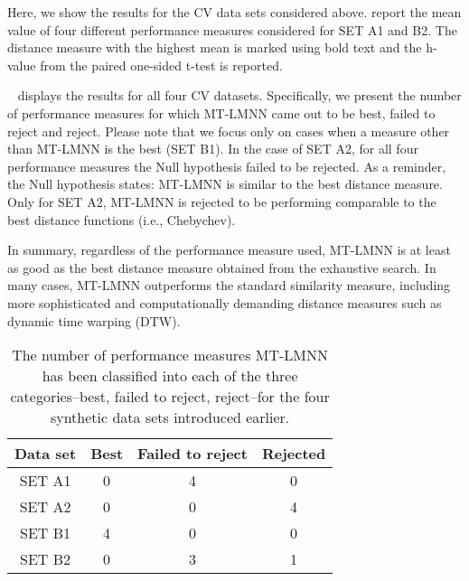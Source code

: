 Here, we show the results for the CV data sets considered above.   report the mean value of four different performance measures considered for SET A1 and B2. 
The distance measure with the highest mean is marked using bold text and the h-value from the paired one-sided t-test is reported.

~ displays the results for all four CV datasets. Specifically, we present the number of performance measures for which MT-LMNN came out to be best, failed to reject and reject. Please note that we focus only on cases when a measure other than MT-LMNN is the best (SET B1). 
In the case of SET A2, for all four performance measures the Null hypothesis failed to be rejected. As a reminder, the Null hypothesis states: MT-LMNN is similar to the best distance measure. Only for SET A2, MT-LMNN is rejected to be performing comparable to the best distance functions (i.e., Chebychev).


In summary, regardless of the performance measure used, MT-LMNN is at least as good as the best distance measure obtained from the exhaustive search. 
In many cases, MT-LMNN outperforms the standard similarity measure, including more sophisticated and computationally demanding distance measures such as dynamic time warping (DTW). 

\begin{table}[h]
     \centering
    \begin{tabular}{ |c|c|c|c| }
      \hline
      Data set & Best & Failed to reject & Rejected \\
      \hline
      SET A1 & 0 & 4 & 0 \\
      \hline
      SET A2 & 0 & 0 & 4 \\
      \hline
      SET B1 & 4 & 0 & 0 \\
      \hline
      SET B2 & 0 & 3 & 1 \\
      \hline
    \end{tabular}
        \captionsetup{justification=centering}
         \caption{The number of performance measures MT-LMNN has been classified into each of the three categories--best, failed to reject, reject--for the four synthetic data sets introduced earlier.}
         \label{ttest_cv}
 \end{table}
 
